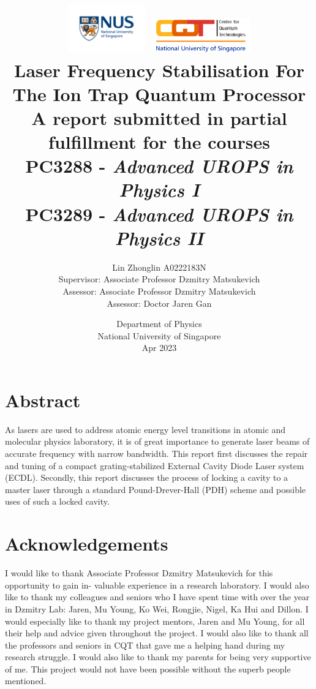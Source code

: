 \documentclass[12pt]{report}
\title{
\includegraphics[width=0.25\textwidth]{nus_logo.jpeg}
\includegraphics[width=0.32\textwidth]{cqt_logo.png}\\
{\LARGE \textbf{Laser Frequency Stabilisation For The Ion Trap Quantum Processor}}\\
\vspace{5mm}
{\normalsize A report submitted in partial fulfillment for the courses}\\
{\normalsize PC3288 - \textit{Advanced UROPS in Physics I}}\\
{\normalsize PC3289 - \textit{Advanced UROPS in Physics II}}
}
\author{
{\normalsize Lin Zhonglin \hspace{10mm} A0222183N}\\
\vspace{1mm}
{\normalsize Supervisor: Associate Professor Dzmitry Matsukevich}\\
{\normalsize Assessor: Associate Professor Dzmitry Matsukevich}\\
{\normalsize Assessor: Doctor Jaren Gan }}\\
\date{{\normalsize Department of Physics}\\
{\normalsize National University of Singapore}\\
{\normalsize Apr 2023}}
\begin{document}
\justifying
\linespread{1.2}
\setlength{\parskip}{1em}
\setlength{\parindent}{0pt}

\maketitle

\chapter*{Abstract}
As lasers are used to address atomic energy level transitions in atomic and molecular physics laboratory, it is of great importance to generate laser beams of accurate frequency with narrow bandwidth. This report first discusses the repair and tuning of a compact grating-stabilized External Cavity Diode Laser system (ECDL). Secondly, this report discusses the process of locking a cavity to a master laser through a standard Pound-Drever-Hall (PDH) scheme and possible uses of such a locked cavity. 


\chapter*{Acknowledgements}
I would like to thank Associate Professor Dzmitry Matsukevich for this opportunity to gain in- valuable experience in a research laboratory.
I would also like to thank my colleagues and seniors who I have spent time with over the year in Dzmitry Lab: Jaren, Mu Young, Ko Wei, Rongjie, Nigel, Ka Hui and Dillon. I would especially like to thank my project mentors, Jaren and Mu Young, for all their help and advice given throughout the project. I would also like to thank all the professors and seniors in CQT that gave me a helping hand during my research struggle. 
I would also like to thank my parents for being very supportive of me.
This project would not have been possible without the superb people mentioned.

\tableofcontents
\end{document}
